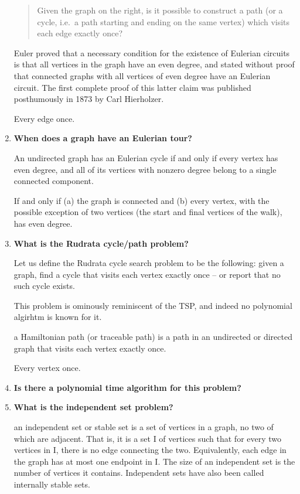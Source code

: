 \documentclass[a4paper,11pt]{article}
\begin{document}
\begin{enumerate}
  \begin{quote}
  Given the graph on the right, is it possible to construct a path (or a
  cycle, i.e.~a path starting and ending on the same vertex) which
  visits each edge exactly once?
  \end{quote}

  Euler proved that a necessary condition for the existence of Eulerian
  circuits is that all vertices in the graph have an even degree, and
  stated without proof that connected graphs with all vertices of even
  degree have an Eulerian circuit. The first complete proof of this
  latter claim was published posthumously in 1873 by Carl Hierholzer.

  Every edge once.
\item
  \textbf{When does a graph have an Eulerian tour?}

  An undirected graph has an Eulerian cycle if and only if every vertex
  has even degree, and all of its vertices with nonzero degree belong to
  a single connected component.

  If and only if (a) the graph is connected and (b) every vertex, with
  the possible exception of two vertices (the start and final vertices
  of the walk), has even degree.
\item
  \textbf{What is the Rudrata cycle/path problem?}

  Let us define the Rudrata cycle search problem to be the following:
  given a graph, find a cycle that visits each vertex exactly once -- or
  report that no such cycle exists.

  This problem is ominously reminiscent of the TSP, and indeed no
  polynomial algirhtm is known for it.

  a Hamiltonian path (or traceable path) is a path in an undirected or
  directed graph that visits each vertex exactly once.

  Every vertex once.
\item
  \textbf{Is there a polynomial time algorithm for this problem?}
\item
  \textbf{What is the independent set problem?}

  an independent set or stable set is a set of vertices in a graph, no
  two of which are adjacent. That is, it is a set I of vertices such
  that for every two vertices in I, there is no edge connecting the two.
  Equivalently, each edge in the graph has at most one endpoint in I.
  The size of an independent set is the number of vertices it contains.
  Independent sets have also been called internally stable sets.


\end{enumerate}
\end{document}
